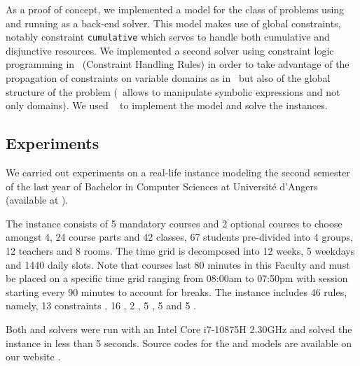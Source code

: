 As a proof of concept, we implemented a {\CP} model for the class of {\UTP} problems using \MINIZINC{} and running {\GECODE} \cite{GECODE} as a back-end solver.
This model makes use of global constraints, notably constraint \texttt{cumulative} \cite{beldiceanu2002new} which serves to handle both cumulative and disjunctive resources.
We implemented a second solver using constraint logic programming in \CHR\ (Constraint Handling Rules) in order to take advantage of the propagation of constraints on variable domains as in \CP\ but also of the global structure of the problem (\CHR\ allows to manipulate symbolic expressions and not only domains).
We used \CHRPP\ \cite{barichard_stephan_2019} to implement the model and solve the instances.



\subsection{Experiments}
We carried out experiments on a real-life instance modeling the second semester of the last year of Bachelor in Computer Sciences at Université d'Angers (available at \cite{USPsite}).

The instance consists of 5 mandatory courses and 2 optional courses to choose amongst 4, 24 course parts and 42 classes, 67 students pre-divided into 4 groups, 12 teachers and 8 rooms.
The time grid is decomposed into 12 weeks, 5 weekdays and 1440 daily slots.
Note that courses last 80 minutes in this Faculty and must be placed on a specific time grid ranging from 08\string:00am to 07\string:50pm with session starting every 90 minutes to account for breaks.
The instance includes 46 rules, namely, 13 constraints \texttt{\WEEKLY}, 16 \texttt{\SEQUENCED}, 2 \texttt{\SAMESLOT}, 5 \texttt{\SAMEWEEK}, 5 \texttt{\SAMEROOMS} and 5 \texttt{\SAMETEACHERS}.

Both \MINIZINC{} and \CHRPP{} solvers were run with an Intel Core i7-10875H 2.30GHz and solved the instance in less than 5 seconds.
%
Source codes for the \MINIZINC{} and \CHRPP{} models are available on our website \cite{USPsite}.